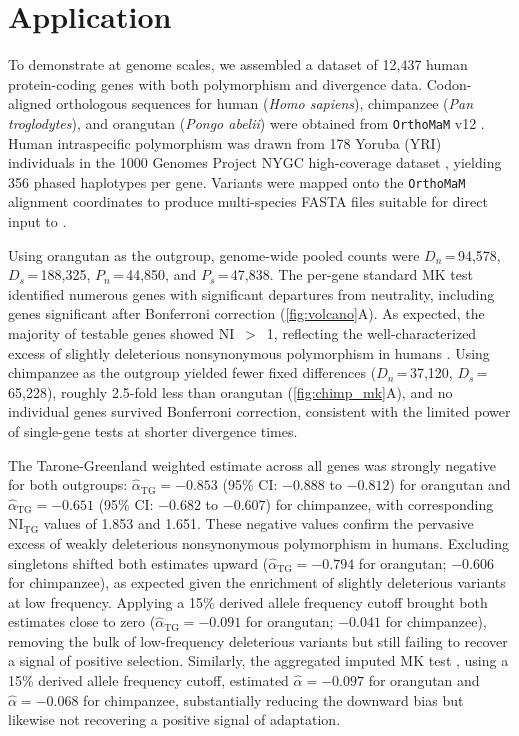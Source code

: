 \section{Application}

To demonstrate \mkado at genome scales,
we assembled a dataset of 12,437 human protein-coding genes
with both polymorphism and divergence data.
Codon-aligned orthologous sequences
for human (\textit{Homo sapiens}),
chimpanzee (\textit{Pan troglodytes}),
and orangutan (\textit{Pongo abelii})
were obtained from \texttt{OrthoMaM} v12 \citep{orthomam2024}.
Human intraspecific polymorphism was drawn from 178 Yoruba (YRI)
individuals in the 1000 Genomes Project NYGC high-coverage dataset
\citep{1000genomes2015},
yielding 356 phased haplotypes per gene.
Variants were mapped onto the \texttt{OrthoMaM} alignment coordinates
to produce multi-species FASTA files
suitable for direct input to \mkado.

Using orangutan as the outgroup,
genome-wide pooled counts were
$D_n$\,=\,94,578, $D_s$\,=\,188,325, $P_n$\,=\,44,850,
and $P_s$\,=\,47,838.
The per-gene standard MK test identified numerous genes
with significant departures from neutrality,
including genes significant after Bonferroni correction
(\cref{fig:volcano}A). As expected,
the majority of testable genes showed NI~$>$~1,
reflecting the well-characterized excess
of slightly deleterious nonsynonymous polymorphism in humans
\citep{li2008}.
Using chimpanzee as the outgroup yielded fewer fixed differences
($D_n$\,=\,37,120, $D_s$\,=\,65,228), roughly 2.5-fold less than
orangutan (\cref{fig:chimp_mk}A),
and no individual genes survived Bonferroni correction,
consistent with the limited power of single-gene tests
at shorter divergence times.

The Tarone-Greenland weighted estimate \citep{stoletzki2011}
across all genes was strongly negative for both outgroups:
$\hat{\alpha}_\text{TG} = -0.853$
(95\% CI: $-0.888$ to $-0.812$)
for orangutan
and $\hat{\alpha}_\text{TG} = -0.651$
(95\% CI: $-0.682$ to $-0.607$)
for chimpanzee,
with corresponding $\text{NI}_\text{TG}$ values of 1.853 and 1.651.
These negative values confirm the pervasive excess
of weakly deleterious nonsynonymous polymorphism in humans.
Excluding singletons shifted both estimates upward
($\hat{\alpha}_\text{TG} = -0.794$ for orangutan;
$-0.606$ for chimpanzee),
as expected given the enrichment of slightly deleterious
variants at low frequency.
Applying a 15\% derived allele frequency cutoff
\citep{fay2001}
brought both estimates close to zero
($\hat{\alpha}_\text{TG} = -0.091$ for orangutan;
$-0.041$ for chimpanzee),
removing the bulk of low-frequency deleterious variants
but still failing to recover a signal of positive selection.
Similarly, the aggregated imputed MK test \citep{murga-moreno2022},
using a 15\% derived allele frequency cutoff,
estimated $\hat{\alpha} = -0.097$ for orangutan
and $\hat{\alpha} = -0.068$ for chimpanzee,
substantially reducing the downward bias
but likewise not recovering a positive signal of adaptation.

